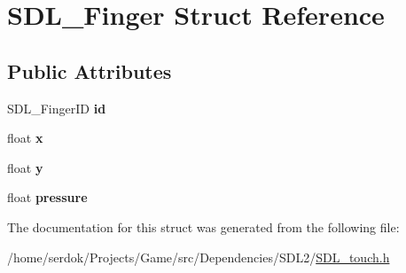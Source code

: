 \hypertarget{structSDL__Finger}{}\section{S\+D\+L\+\_\+\+Finger Struct Reference}
\label{structSDL__Finger}
\subsection*{Public Attributes}
\begin{DoxyCompactItemize}
\item 
\mbox{\label{structSDL__Finger_a3cec630146eeec5bd6299a9387a6f16a}} 
S\+D\+L\+\_\+\+Finger\+ID {\bfseries id}
\item 
\mbox{\label{structSDL__Finger_ab91dfbd03c3215560457fef44e1c7755}} 
float {\bfseries x}
\item 
\mbox{\label{structSDL__Finger_a0a2c7a06ae641940111e03801c672cf9}} 
float {\bfseries y}
\item 
\mbox{\label{structSDL__Finger_a0ecb50c7fd699d59899ac60c941bdee6}} 
float {\bfseries pressure}
\end{DoxyCompactItemize}


The documentation for this struct was generated from the following file\+:\begin{DoxyCompactItemize}
\item 
/home/serdok/\+Projects/\+Game/src/\+Dependencies/\+S\+D\+L2/\hyperlink{SDL__touch_8h}{S\+D\+L\+\_\+touch.\+h}\end{DoxyCompactItemize}
